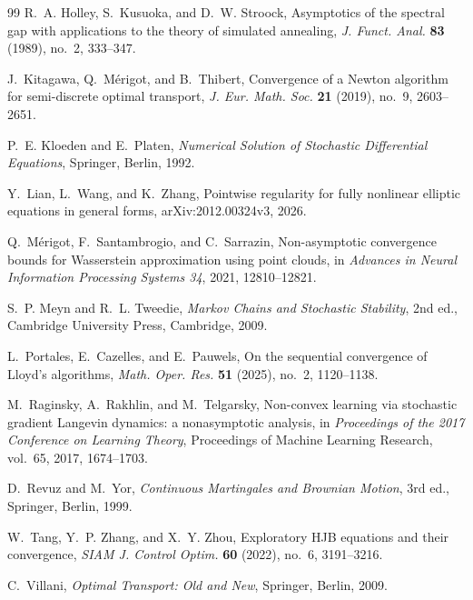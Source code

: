 \documentclass[11pt]{article}
\theoremstyle{definition}
\theoremstyle{remark}
\numberwithin{equation}{section}
\begin{document}
\begin{thebibliography}{99}
R.~A. Holley, S.~Kusuoka, and D.~W. Stroock,
\newblock Asymptotics of the spectral gap with applications to the theory of simulated annealing,
\newblock \emph{J. Funct. Anal.} \textbf{83} (1989), no.~2, 333--347.

J.~Kitagawa, Q.~M\'erigot, and B.~Thibert,
\newblock Convergence of a Newton algorithm for semi-discrete optimal transport,
\newblock \emph{J. Eur. Math. Soc.} \textbf{21} (2019), no.~9, 2603--2651.

P.~E. Kloeden and E.~Platen,
\newblock \emph{Numerical Solution of Stochastic Differential Equations},
\newblock Springer, Berlin, 1992.

Y.~Lian, L.~Wang, and K.~Zhang,
\newblock Pointwise regularity for fully nonlinear elliptic equations in general forms,
\newblock arXiv:2012.00324v3, 2026.

Q.~M\'erigot, F.~Santambrogio, and C.~Sarrazin,
\newblock Non-asymptotic convergence bounds for Wasserstein approximation using point clouds,
\newblock in \emph{Advances in Neural Information Processing Systems 34}, 2021, 12810--12821.

S.~P. Meyn and R.~L. Tweedie,
\newblock \emph{Markov Chains and Stochastic Stability},
\newblock 2nd ed., Cambridge University Press, Cambridge, 2009.

L.~Portales, E.~Cazelles, and E.~Pauwels,
\newblock On the sequential convergence of Lloyd's algorithms,
\newblock \emph{Math. Oper. Res.} \textbf{51} (2025), no.~2, 1120--1138.

M.~Raginsky, A.~Rakhlin, and M.~Telgarsky,
\newblock Non-convex learning via stochastic gradient Langevin dynamics: a nonasymptotic analysis,
\newblock in \emph{Proceedings of the 2017 Conference on Learning Theory},
Proceedings of Machine Learning Research, vol.~65, 2017, 1674--1703.

D.~Revuz and M.~Yor,
\newblock \emph{Continuous Martingales and Brownian Motion},
\newblock 3rd ed., Springer, Berlin, 1999.

W.~Tang, Y.~P. Zhang, and X.~Y. Zhou,
\newblock Exploratory HJB equations and their convergence,
\newblock \emph{SIAM J. Control Optim.} \textbf{60} (2022), no.~6, 3191--3216.

C.~Villani,
\newblock \emph{Optimal Transport: Old and New},
\newblock Springer, Berlin, 2009.


\end{thebibliography}
\end{document}

